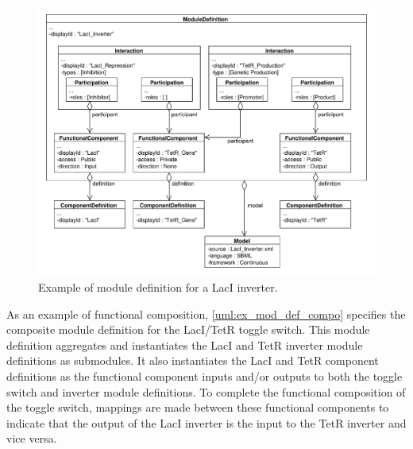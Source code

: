\begin{figure}[ht]
\begin{center}
\includegraphics[width=\textwidth]{example_uml/toggle_3}
\caption[]{Example of module definition for a LacI inverter.}
\label{uml:ex_mod_def}
\end{center}
\end{figure}

As an example of functional composition, \ref{uml:ex_mod_def_compo} specifies the composite module definition for the LacI/TetR toggle switch. This module definition aggregates and instantiates the LacI and TetR inverter module definitions as submodules. It also instantiates the LacI and TetR component definitions as the functional component inputs and/or outputs to both the toggle switch and inverter module definitions. To complete the functional composition of the toggle switch, mappings are made between these functional components to indicate that the output of the LacI inverter is the input to the TetR inverter and vice versa.

